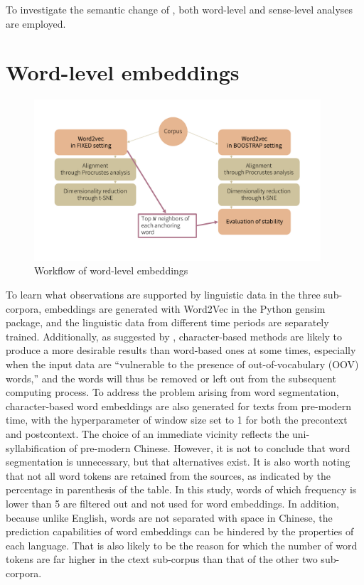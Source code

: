 To investigate the semantic change of \jia\rspace, both word-level and sense-level analyses are employed.

\section{Word-level embeddings}

\begin{figure}[H]
  \centering
  \includegraphics[height=0.4\textheight,width=0.95\textwidth,keepaspectratio]{figures_new/from_slides/workflow_word_level.pdf}
  \caption{Workflow of word-level embeddings}
  \label{fig:workflow_word_level}
\end{figure}

To learn what observations are supported by linguistic data in the three sub-corpora, embeddings are generated with Word2Vec in the Python gensim package, and the linguistic data from different time periods are separately trained. Additionally, as suggested by \textcite{li2019word}, character-based methods are likely to produce a more desirable results than word-based ones at some times, especially when the input data are ``vulnerable to the presence of out-of-vocabulary (OOV) words,'' and the words will thus be removed or left out from the subsequent computing process. To address the problem arising from word segmentation, character-based word embeddings are also generated for texts from pre-modern time, with the hyperparameter of window size set to 1 for both the precontext and postcontext. The choice of an immediate vicinity reflects the uni-syllabification of pre-modern Chinese. However, it is not to conclude that word segmentation is unnecessary, but that alternatives exist.  It is also worth noting that not all word tokens are retained from the sources, as indicated by the percentage in parenthesis of the table. In this study, words of which frequency is lower than 5 are filtered out and not used for word embeddings. In addition, because unlike English, words are not separated with space in Chinese, the prediction capabilities of word embeddings can be hindered by the properties of each language. That is also likely to be the reason for which the number of word tokens are far higher in the \gls{ctext} sub-corpus than that of the other two sub-corpora.

